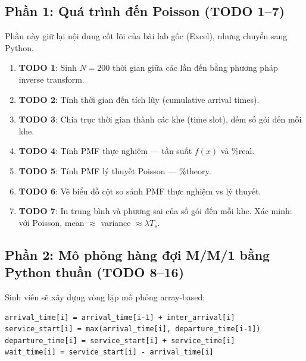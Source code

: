 \documentclass[12pt,a4paper]{article}
\begin{document}
\subsection{Phần 1: Quá trình đến Poisson (TODO 1–7)}

Phần này giữ lại nội dung cốt lõi của bài lab gốc (Excel), nhưng chuyển sang Python.

\begin{enumerate}[nosep]
  \item \textbf{TODO 1}: Sinh $N=200$ thời gian giữa các lần đến bằng phương pháp inverse transform.
  \item \textbf{TODO 2}: Tính thời gian đến tích lũy (cumulative arrival times).
  \item \textbf{TODO 3}: Chia trục thời gian thành các khe (time slot), đếm số gói đến mỗi khe.
  \item \textbf{TODO 4}: Tính PMF thực nghiệm — tần suất $f(x)$ và \%real.
  \item \textbf{TODO 5}: Tính PMF lý thuyết Poisson — \%theory.
  \item \textbf{TODO 6}: Vẽ biểu đồ cột so sánh PMF thực nghiệm vs lý thuyết.
  \item \textbf{TODO 7}: In trung bình và phương sai của số gói đến mỗi khe. Xác minh: với Poisson, mean $\approx$ variance $\approx \lambda T_s$.
\end{enumerate}

\subsection{Phần 2: Mô phỏng hàng đợi M/M/1 bằng Python thuần (TODO 8–16)}

Sinh viên sẽ xây dựng vòng lặp mô phỏng array-based:

\begin{lstlisting}
arrival_time[i] = arrival_time[i-1] + inter_arrival[i]
service_start[i] = max(arrival_time[i], departure_time[i-1])
departure_time[i] = service_start[i] + service_time[i]
wait_time[i] = service_start[i] - arrival_time[i]
\end{lstlisting}
\end{document}
